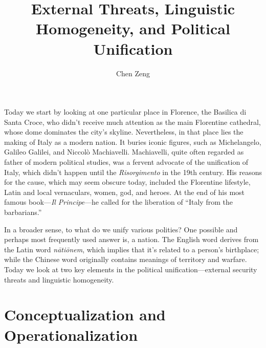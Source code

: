 \documentclass[a4paper,12pt]{article}
\title{External Threats, Linguistic Homogeneity, and Political Unification}
\author{Chen Zeng}
\begin{document}
	
	\maketitle
	
	Today we start by looking at one particular place in Florence, the Basilica di Santa Croce, who didn't receive much attention as the main Florentine cathedral, whose dome dominates the city's skyline. Nevertheless, in that place lies the making of Italy as a modern nation. It buries iconic figures, such as Michelangelo, Galileo Galilei, and Niccolò Machiavelli. Machiavelli, quite often regarded as father of modern political studies, was a fervent advocate of the unification of Italy, which didn't happen until the \textit{Risorgimento} in the 19th century. His reasons for the cause, which may seem obscure today, included the Florentine lifestyle, Latin and local vernaculars, women, god, and heroes. At the end of his most famous book---\textit{Il Principe}---he called for the liberation of ``Italy from the barbarians.''
	
	In a broader sense, to what do we unify various polities? One possible and perhaps most frequently used answer is, a nation. The English word derives from the Latin word \textit{nātiōnem}, which implies that it's related to a person's birthplace; while the Chinese word originally contains meanings of territory and warfare. Today we look at two key elements in the political unification---external security threats and linguistic homogeneity.
	
	\section{Conceptualization and Operationalization}
	
	
	
\end{document}
